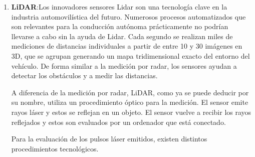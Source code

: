 \begin{enumerate}
		\begin{figure}[h]
			\centering
			\hfill
		\end{figure}	
		
		\item \textbf{LiDAR}:Los innovadores sensores Lidar son una tecnología clave en la industria automovilística del futuro. Numerosos procesos automatizados que son relevantes para la conducción autónoma prácticamente no podrían llevarse a cabo sin la ayuda de Lidar. Cada segundo se realizan miles de mediciones de distancias individuales a partir de entre 10 y 30 imágenes en 3D, que se agrupan generando un mapa tridimensional exacto del entorno del vehículo. De forma similar a la medición por radar, los sensores ayudan a detectar los obstáculos y a medir las distancias.
		
		A diferencia de la medición por radar, LiDAR, como ya se puede deducir por su nombre, utiliza un procedimiento óptico para la medición.
		El sensor emite rayos láser y estos se reflejan en un objeto. El sensor vuelve a recibir los rayos reflejados y estos son evaluados por un ordenador que está conectado.
		
		Para la evaluación de los pulsos láser emitidos, existen distintos procedimientos tecnológicos. \cite{LiDAR}
		
		\begin{figure}[h]
			\centering
			\hfill
		\end{figure}	
		
		\end{enumerate}
		
